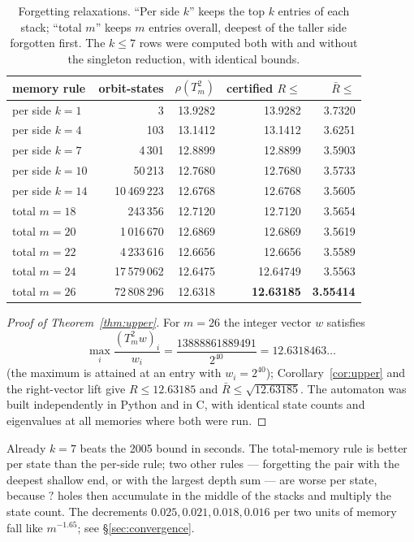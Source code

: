 \documentclass[11pt]{amsart}
\theoremstyle{definition}
\newcommand{\Rb}{\bar R}
\newcommand{\qq}{\mathord{?}}
\begin{document}
\begin{table}[h]
\centering
\begin{tabular}{lrrrr}
\toprule
memory rule & orbit-states & $\rho(T_m^2)$ & certified $R\le$ & $\Rb\le$\\
\midrule
per side $k=1$ & 3 & 13.9282 & 13.9282 & 3.7320\\
per side $k=4$ & 103 & 13.1412 & 13.1412 & 3.6251\\
per side $k=7$ & 4\,301 & 12.8899 & 12.8899 & 3.5903\\
per side $k=10$ & 50\,213 & 12.7680 & 12.7680 & 3.5733\\
per side $k=14$ & 10\,469\,223 & 12.6768 & 12.6768 & 3.5605\\
total $m=18$ & 243\,356 & 12.7120 & 12.7120 & 3.5654\\
total $m=20$ & 1\,016\,670 & 12.6869 & 12.6869 & 3.5619\\
total $m=22$ & 4\,233\,616 & 12.6656 & 12.6656 & 3.5589\\
total $m=24$ & 17\,579\,062 & 12.6475 & 12.64749 & 3.5563\\
total $m=26$ & 72\,808\,296 & 12.6318 & \textbf{12.63185} & \textbf{3.55414}\\
\bottomrule
\end{tabular}
\caption{Forgetting relaxations. ``Per side $k$'' keeps the top $k$ entries of each stack; ``total $m$'' keeps $m$ entries overall, deepest of the taller side forgotten first. The $k\le7$ rows were computed both with and without the singleton reduction, with identical bounds.}\label{tab:upper}
\end{table}

\begin{proof}[Proof of Theorem~\ref{thm:upper}]
For $m=26$ the integer vector $w$ satisfies
\[\max_i\frac{(T_m^2w)_i}{w_i}=\frac{13888861889491}{2^{40}}=12.6318463\ldots\]
(the maximum is attained at an entry with $w_i=2^{40}$); Corollary~\ref{cor:upper} and the right-vector lift give $R\le12.63185$ and $\Rb\le\sqrt{12.63185}$. The automaton was built independently in Python and in C, with identical state counts and eigenvalues at all memories where both were run.
\end{proof}

Already $k=7$ beats the 2005 bound in seconds. The total-memory rule is better per state than the per-side rule; two other rules --- forgetting the pair with the deepest shallow end, or with the largest depth sum --- are worse per state, because $\qq$ holes then accumulate in the middle of the stacks and multiply the state count. The decrements $0.025,0.021,0.018,0.016$ per two units of memory fall like $m^{-1.65}$; see \S\ref{sec:convergence}.
\end{document}
